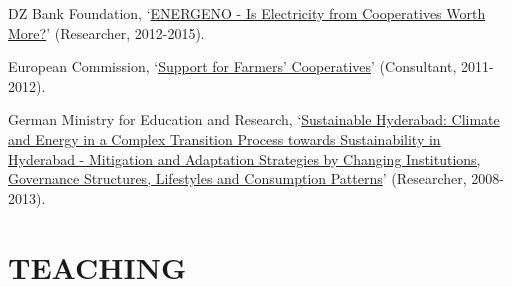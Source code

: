 \documentclass[paper=a4,fontsize=11pt]{scrartcl} %
\newcommand{\NewPart}[2]{\section*{\uppercase{#1} #2}}
\newcommand{\FundingEntry}[4]{
        \noindent #1, `#2' (#3, #4).}
\newcommand{\TalkEntry}[4]{
		\noindent #1, #2, #3 #4}
\begin{document}
\begin{etaremune}
\item\FundingEntry {DZ Bank Foundation}{\href{https://www.agrar.hu-berlin.de/de/institut/departments/daoe/koopwiss/forschung/energeno}{ENERGENO - Is Electricity from Cooperatives Worth More?}}{Researcher}{2012-2015}

\item\FundingEntry {European Commission}{\href{https://ec.europa.eu/agriculture/external-studies/support-farmers-coop_en}{Support for Farmers’ Cooperatives}}{Consultant}{2011-2012}

\item\FundingEntry {German Ministry for Education and Research}{\href{https://www.iaaw.hu-berlin.de/de/hip/institutes/resecon}{Sustainable Hyderabad: Climate and Energy in a Complex Transition Process towards Sustainability in Hyderabad - Mitigation and Adaptation Strategies by Changing Institutions, Governance Structures, Lifestyles and Consumption Patterns}}{Researcher}{2008-2013}

\end{etaremune}





\NewPart{Teaching}{}
\end{document}
